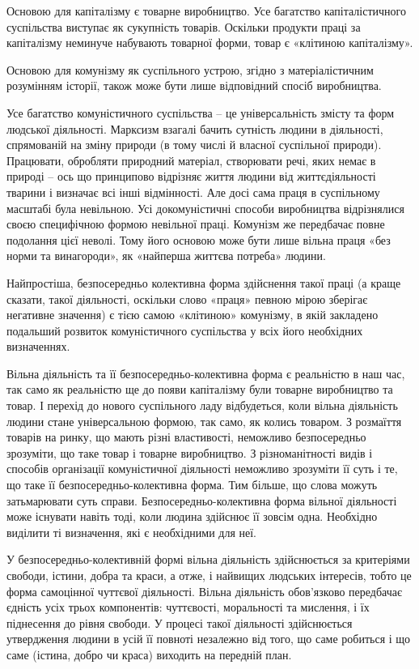 \documentclass[12pt,a4paper,openany]{book}
\begin{document}
Основою для капіталізму є товарне виробництво. Усе багатство капіталістичного суспільства виступає як сукупність товарів. Оскільки продукти праці за капіталізму неминуче набувають товарної форми, товар є «клітиною капіталізму».

Основою для комунізму як суспільного устрою, згідно з матеріалістичним розумінням історії, також може бути лише відповідний спосіб виробництва.

Усе багатство комуністичного суспільства – це універсальність змісту та форм людської діяльності. Марксизм взагалі бачить сутність людини в діяльності, спрямованій на зміну природи (в тому числі й власної суспільної природи). Працювати, обробляти природний матеріал, створювати речі, яких немає в природі – ось що принципово відрізняє життя людини від життєдіяльності тварини і визначає всі інші відмінності. Але досі сама праця в суспільному масштабі була невільною. Усі докомуністичні способи виробництва відрізнялися своєю специфічною формою невільної праці. Комунізм же передбачає повне подолання цієї неволі. Тому його основою може бути лише вільна праця «без норми та винагороди», як «найперша життєва потреба» людини.

Найпростіша, безпосередньо колективна форма здійснення такої праці (а краще сказати, такої діяльності, оскільки слово «праця» певною мірою зберігає негативне значення) є тією самою «клітиною» комунізму, в якій закладено подальший розвиток комуністичного суспільства у всіх його необхідних визначеннях.

Вільна діяльність та її безпосередньо-колективна форма є реальністю в наш час, так само як реальністю ще до появи капіталізму були товарне виробництво та товар. І перехід до нового суспільного ладу відбудеться, коли вільна діяльність людини стане універсальною формою, так само, як колись товаром. З розмаїття товарів на ринку, що мають різні властивості, неможливо безпосередньо зрозуміти, що таке товар і товарне виробництво. З різноманітності видів і способів організації комуністичної діяльності неможливо зрозуміти її суть і те, що таке її безпосередньо-колективна форма. Тим більше, що слова можуть затьмарювати суть справи. Безпосередньо-колективна форма вільної діяльності може існувати навіть тоді, коли людина здійснює її зовсім одна. Необхідно виділити ті визначення, які є необхідними для неї.

У безпосередньо-колективній формі вільна діяльність здійснюється за критеріями свободи, істини, добра та краси, а отже, і найвищих людських інтересів, тобто це форма самоцінної чуттєвої діяльності. Вільна діяльність обов’язково передбачає єдність усіх трьох компонентів: чуттєвості, моральності та мислення, і їх піднесення до рівня свободи. У процесі такої діяльності здійснюється утвердження людини в усій її повноті незалежно від того, що саме робиться і що саме (істина, добро чи краса) виходить на передній план.
\end{document}
